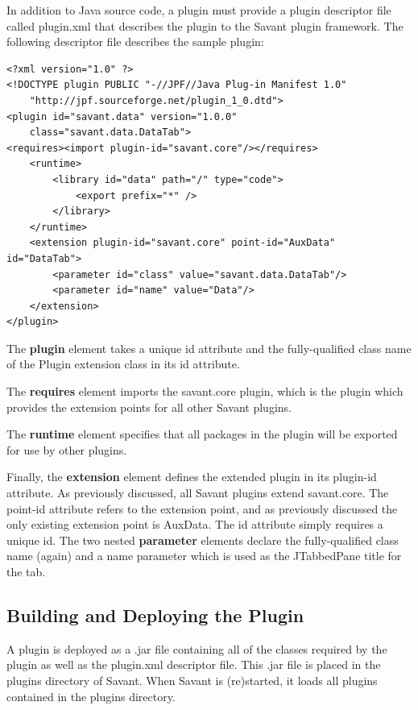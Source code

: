 \documentclass{report}
\begin{document}
In addition to Java source code, a plugin must provide a plugin descriptor file called plugin.xml that describes the plugin to the Savant plugin framework. The following descriptor file describes the sample plugin:

\begin{verbatim}
<?xml version="1.0" ?>
<!DOCTYPE plugin PUBLIC "-//JPF//Java Plug-in Manifest 1.0" 
    "http://jpf.sourceforge.net/plugin_1_0.dtd">
<plugin id="savant.data" version="1.0.0"
    class="savant.data.DataTab">
<requires><import plugin-id="savant.core"/></requires>
    <runtime>
        <library id="data" path="/" type="code">
            <export prefix="*" />
        </library>
    </runtime>
    <extension plugin-id="savant.core" point-id="AuxData" id="DataTab">
        <parameter id="class" value="savant.data.DataTab"/>
        <parameter id="name" value="Data"/>
    </extension>
</plugin>
\end{verbatim} 

The {\bf plugin} element takes a unique id attribute and the fully-qualified class name of the Plugin extension class in its id attribute.

The {\bf requires} element imports the savant.core plugin, which is the plugin which provides the extension points for all other Savant plugins.

The {\bf runtime} element specifies that all packages in the plugin will be exported for use by other plugins.

Finally, the {\bf extension} element defines the extended plugin in its plugin-id attribute. As previously discussed, all Savant plugins extend savant.core. The point-id attribute refers to the extension point, and as previously discussed the only existing extension point is AuxData. The id attribute simply requires a unique id. The two nested {\bf parameter} elements declare the fully-qualified class name (again) and a name parameter which is used as the JTabbedPane title for the tab.

\subsection{Building and Deploying the Plugin}

A plugin is deployed as a .jar file containing all of the classes required by the plugin as well as the plugin.xml descriptor file. This .jar file is placed in the plugins directory of Savant. When Savant is (re)started, it loads all plugins contained in the plugins directory.
\end{document}
